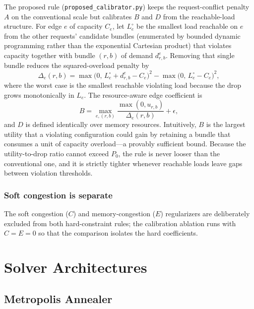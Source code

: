 \documentclass[10pt,a4paper]{article}
\begin{document}
The proposed rule (\texttt{proposed\_calibrator.py}) keeps the
request-conflict penalty $A$ on the conventional scale but calibrates
$B$ and $D$ from the reachable-load structure.  For edge $e$ of
capacity $C_e$, let $L_e^{\circ}$ be the smallest load reachable on
$e$ from the other requests' candidate bundles (enumerated by bounded
dynamic programming rather than the exponential Cartesian product)
that violates capacity together with bundle $(r,b)$ of demand
$d_{r,b}^e$.  Removing that single bundle reduces the squared-overload
penalty by
\begin{equation}
  \Delta_e(r,b) = \max\!\bigl(0,\, L_e^{\circ} + d_{r,b}^e - C_e\bigr)^2
    - \max\!\bigl(0,\, L_e^{\circ} - C_e\bigr)^2,
  \label{eq:calib-drop}
\end{equation}
where the worst case is the smallest reachable violating load because
the drop grows monotonically in $L_e$.  The resource-aware edge
coefficient is
\begin{equation}
  B = \max_{e,(r,b)} \frac{\max(0, u_{r,b})}{\Delta_e(r,b)}
    + \epsilon,
  \label{eq:calib-edge}
\end{equation}
and $D$ is defined identically over memory resources.  Intuitively,
$B$ is the largest utility that a violating configuration could gain
by retaining a bundle that consumes a unit of capacity overload---a
provably sufficient bound.  Because the utility-to-drop ratio cannot
exceed $P_0$, the rule is never looser than the conventional one, and
it is strictly tighter whenever reachable loads leave gaps between
violation thresholds.

\subsubsection{Soft congestion is separate}

The soft congestion ($C$) and memory-congestion ($E$) regularizers are
deliberately excluded from both hard-constraint rules; the calibration
ablation runs with $C = E = 0$ so that the comparison isolates the
hard coefficients.

\section{Solver Architectures}
\label{sec:solvers}

\subsection{Metropolis Annealer}
\label{sec:metropolis}
\end{document}
